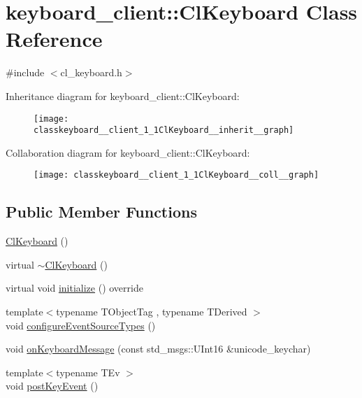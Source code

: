 \hypertarget{classkeyboard__client_1_1ClKeyboard}{}\section{keyboard\+\_\+client\+:\+:Cl\+Keyboard Class Reference}
\label{classkeyboard__client_1_1ClKeyboard}


{\ttfamily \#include $<$cl\+\_\+keyboard.\+h$>$}



Inheritance diagram for keyboard\+\_\+client\+:\+:Cl\+Keyboard\+:
\nopagebreak
\begin{figure}[H]
\begin{center}
\leavevmode
\texttt{[image: classkeyboard\_\_client\_1\_1ClKeyboard\_\_inherit\_\_graph]}
\end{center}
\end{figure}


Collaboration diagram for keyboard\+\_\+client\+:\+:Cl\+Keyboard\+:
\nopagebreak
\begin{figure}[H]
\begin{center}
\leavevmode
\texttt{[image: classkeyboard\_\_client\_1\_1ClKeyboard\_\_coll\_\_graph]}
\end{center}
\end{figure}
\subsection*{Public Member Functions}
\begin{DoxyCompactItemize}
\item 
\hyperlink{classkeyboard__client_1_1ClKeyboard_a4da263c77c076b959c4c21160af1bcb5}{Cl\+Keyboard} ()
\item 
virtual \hyperlink{classkeyboard__client_1_1ClKeyboard_a0e9bfb4a0e564e26f57248a78a78d087}{$\sim$\+Cl\+Keyboard} ()
\item 
virtual void \hyperlink{classkeyboard__client_1_1ClKeyboard_a7ac4502969c62b0c836b531cec05f8ed}{initialize} () override
\item 
{\footnotesize template$<$typename T\+Object\+Tag , typename T\+Derived $>$ }\\void \hyperlink{classkeyboard__client_1_1ClKeyboard_a9643ea9235ee12d054c87f79fbf31211}{configure\+Event\+Source\+Types} ()
\item 
void \hyperlink{classkeyboard__client_1_1ClKeyboard_adbfb9c2b98f784b12cf7740b4e861d8e}{on\+Keyboard\+Message} (const std\+\_\+msgs\+::\+U\+Int16 \&unicode\+\_\+keychar)
\item 
{\footnotesize template$<$typename T\+Ev $>$ }\\void \hyperlink{classkeyboard__client_1_1ClKeyboard_ad62d3548adfeca7f31469a283454dbeb}{post\+Key\+Event} ()
\end{DoxyCompactItemize}
